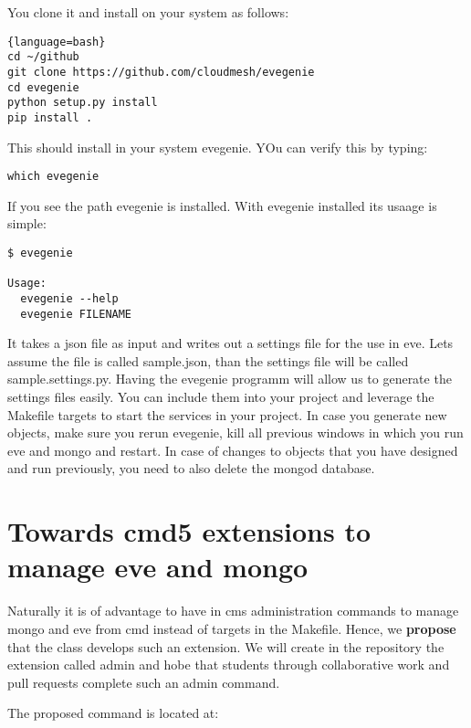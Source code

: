 You clone it and install on your system as follows:

\begin{lstlisting}{language=bash}
cd ~/github
git clone https://github.com/cloudmesh/evegenie
cd evegenie
python setup.py install
pip install .
\end{lstlisting}

This should install in your system evegenie. YOu can verify this by
typing:

\begin{lstlisting}
which evegenie
\end{lstlisting}

If you see the path evegenie is installed. With evegenie installed its
usaage is simple:

\begin{lstlisting}
$ evegenie

Usage:
  evegenie --help
  evegenie FILENAME
\end{lstlisting}

It takes a json file as input and writes out a settings file for the use
in eve. Lets assume the file is called sample.json, than the settings
file will be called sample.settings.py. Having the evegenie programm
will allow us to generate the settings files easily. You can include
them into your project and leverage the Makefile targets to start the
services in your project. In case you generate new objects, make sure
you rerun evegenie, kill all previous windows in which you run eve and
mongo and restart. In case of changes to objects that you have designed
and run previously, you need to also delete the mongod database.

\section{Towards cmd5 extensions to manage eve and
mongo}\label{towards-cmd5-extensions-to-manage-eve-and-mongo}


Naturally it is of advantage to have in cms administration commands to
manage mongo and eve from cmd instead of targets in the Makefile. Hence,
we \textbf{propose} that the class develops such an extension. We will
create in the repository the extension called admin and hobe that
students through collaborative work and pull requests complete such an
admin command.

The proposed command is located at:



